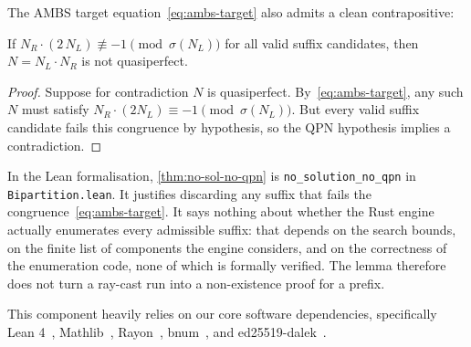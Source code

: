 The AMBS target equation~\eqref{eq:ambs-target} also admits a clean
contrapositive:

\begin{theorem}\label{thm:no-sol-no-qpn}
If $N_R \cdot (2\,N_L) \not\equiv -1 \pmod{\sigma(N_L)}$ for all
valid suffix candidates, then $N = N_L \cdot N_R$ is not quasiperfect.
\end{theorem}

\begin{proof}
Suppose for contradiction $N$ is quasiperfect.
By~\eqref{eq:ambs-target}, any such $N$ must satisfy
$N_R \cdot (2N_L) \equiv -1 \pmod{\sigma(N_L)}$.
But every valid suffix candidate fails this congruence by hypothesis,
so the QPN hypothesis implies a contradiction.
\end{proof}

In the Lean formalisation, \cref{thm:no-sol-no-qpn} is
\texttt{no\_\allowbreak{}solution\_\allowbreak{}no\_\allowbreak{}qpn}
in \texttt{Bipartition.lean}.  It justifies discarding any suffix that
fails the congruence~\eqref{eq:ambs-target}.  It says nothing about
whether the Rust engine actually enumerates every admissible suffix:
that depends on the search bounds, on the finite list of components
the engine considers, and on the correctness of the enumeration code,
none of which is formally verified.  The lemma therefore does not turn
a ray-cast run into a non-existence proof for a prefix.



This component heavily relies on our core software dependencies, specifically Lean 4~\cite{moura2021}, Mathlib~\cite{mathlib2020}, Rayon~\cite{rayon2024}, bnum~\cite{bnum2024}, and ed25519-dalek~\cite{ed25519dalek2024}.
